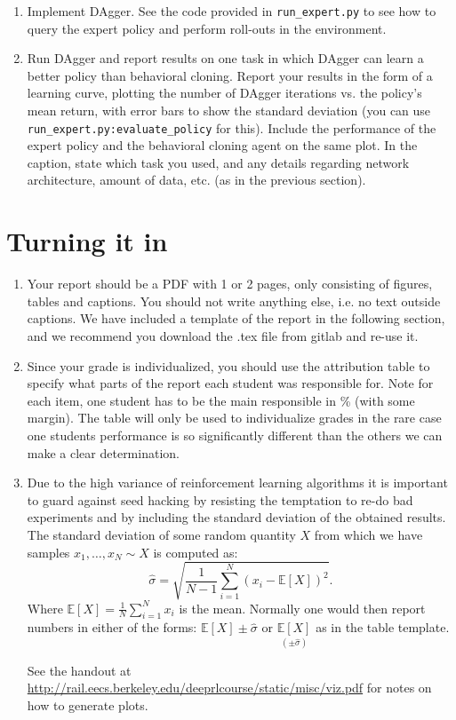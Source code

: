 \documentclass[12pt,twoside]{article}
\begin{document}
\begin{enumerate}
\item  Implement DAgger. See the code provided in \texttt{run_expert.py} to see how to query the expert policy
and perform roll-outs in the environment. 

\item Run DAgger and report results on one task in which DAgger can learn a better policy than behavioral
cloning. Report your results in the form of a learning curve, plotting the number of DAgger iterations
vs. the policy’s mean return, with error bars to show the standard deviation (you can use 
\texttt{run_expert.py:evaluate_policy} for this). Include the performance
of the expert policy and the behavioral cloning agent on the same plot. In the caption, state which
task you used, and any details regarding network architecture, amount of data, etc. (as in the previous
section).
\end{enumerate}

\section{Turning it in}
\begin{enumerate}
\item Your report should be a PDF with 1 or 2 pages, only consisting of figures, tables and captions. You should not write anything else, i.e. no text outside captions. We have included a template of the report in the following section, and we recommend you download the .tex file from gitlab and re-use it. 

\item Since your grade is individualized, you should use the attribution table to specify what parts of the report each student was responsible for. Note for each item, one student has to be the main responsible in \% (with some margin). The table will only be used to individualize grades in the rare case one students performance is so significantly different than the others we can make a clear determination. 

\item Due to the high variance of reinforcement learning algorithms it is important to guard against seed hacking by resisting the temptation to re-do bad experiments and by including the standard deviation of the obtained results. The standard deviation of some random quantity $X$ from which we have samples $x_1, \dots, x_N \sim X$ is computed as:
$$
\hat \sigma = \sqrt{ \frac{1}{N-1}\sum_{i=1}^N (x_i-\mathbb{E}[X])^2 }.
$$
Where $\mathbb{E}[X] = \frac{1}{N}\sum_{i=1}^N x_i$ is the mean. Normally one would then report numbers in either of the forms:
$
\mathbb{E}[X] \pm \hat \sigma 
$
or 
$
\underset{(\pm \hat \sigma )}{\mathbb{E}[X] }
$ as in the table template.

See the handout at \url{http://rail.eecs.berkeley.edu/deeprlcourse/static/misc/viz.pdf} for notes on how to generate plots.
\end{enumerate}
\end{document}
